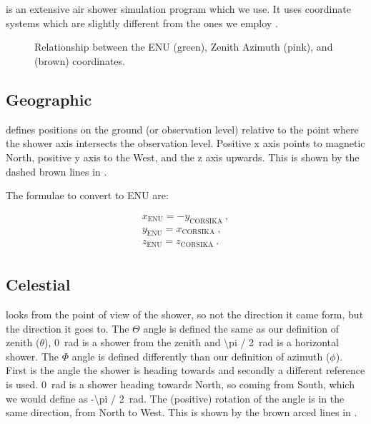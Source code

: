 \section{\corsika}

\corsika is an extensive air shower simulation program which we use. It
uses coordinate systems which are slightly different from the ones we
employ \cite{heck:2013aa}.

\begin{figure}
    \centering
    
    \caption{Relationship between the ENU (green), Zenith Azimuth (pink),
             and \corsika (brown) coordinates.}
    \label{fig:enu_corsika}
\end{figure}


\subsection{Geographic}

\corsika defines positions on the ground (or observation level) relative
to the point where the shower axis intersects the observation level.
Positive x axis points to magnetic North, positive y axis to the West,
and the z axis upwards. This is shown by the dashed brown lines in
.

The formulae to convert \corsika to ENU are:

\begin{equation}
    \begin{array}{l}
        x_{\mathrm{ENU}} = -y_{\mathrm{CORSIKA}} \ , \\
        y_{\mathrm{ENU}} = x_{\mathrm{CORSIKA}} \ , \\
        z_{\mathrm{ENU}} = z_{\mathrm{CORSIKA}} \ . \\
    \end{array}
\end{equation}


\subsection{Celestial}

\corsika looks from the point of view of the shower, so not the
direction it came form, but the direction it goes to. The $\Theta$ angle
is defined the same as our definition of zenith ($\theta$),
\SI{0}{\radian} is a shower from the zenith and \SI{\pi / 2}{\radian} is
a horizontal shower. The $\Phi$ angle is defined differently than our
definition of azimuth ($\phi$). First is the angle the shower is heading
towards and secondly a different reference is used. \SI{0}{\radian} is a
shower heading towards North, so coming from South, which we would
define as \SI{-\pi / 2}{\radian}. The (positive) rotation of the angle
is in the same direction, from North to West. This is shown by the brown
arced lines in .

